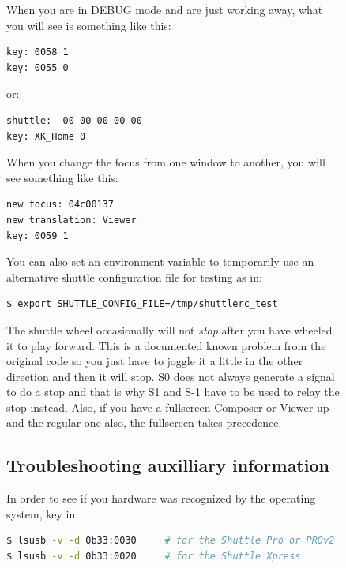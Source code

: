 \begin{figure}
\noindent When you are in DEBUG mode and are just working away, what you will see is something like this:

\begin{lstlisting}[language=Bash]
key: 0058 1 
key: 0055 0
\end{lstlisting}

or:

\begin{lstlisting}[language=Bash]
shuttle:  00 00 00 00 00 
key: XK_Home 0
\end{lstlisting}

\noindent When you change the focus from one window to another, you will see something like this:

\begin{lstlisting}[language=Bash]
new focus: 04c00137 
new translation: Viewer 
key: 0059 1
\end{lstlisting}

\noindent You can also set an environment variable to temporarily use an alternative shuttle configuration file for testing as in:

\begin{lstlisting}[language=Bash]
$ export SHUTTLE_CONFIG_FILE=/tmp/shuttlerc_test 
\end{lstlisting}

\noindent The shuttle wheel occasionally will not \textit{stop} after you have wheeled it to play forward.  This is a documented known problem from the original code so you just have to joggle it a little in the other direction and then it will stop.  S0 does not always generate a signal to do a stop and that is why S1 and S-1 have to be used to relay the stop instead.  Also, if you have a fullscreen Composer or Viewer up and the regular one also, the fullscreen takes precedence.

\subsection{Troubleshooting auxilliary information}%
\label{sub:troubleshooting_auxilliary_information}

In order to see if you hardware was recognized by the operating system, key in:

\begin{lstlisting}[language=Bash]
$ lsusb -v -d 0b33:0030		# for the Shuttle Pro or PROv2 \\
$ lsusb -v -d 0b33:0020		# for the Shuttle Xpress
\end{lstlisting}



\end{figure}
